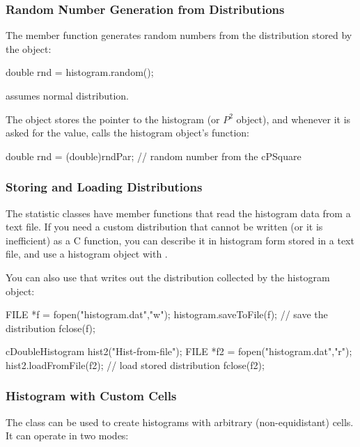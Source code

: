 \subsubsection{Random Number Generation from Distributions}


The  member function generates random
numbers from the distribution stored by the
object:

\begin{cpp}
double rnd = histogram.random();
\end{cpp}


 assumes normal distribution.

The  object stores the pointer to the histogram (or $P^{2}$ object),
and whenever it is asked for the value, calls the histogram object's 
function:

\begin{cpp}
double rnd = (double)rndPar; // random number from the cPSquare
\end{cpp}

\subsubsection{Storing and Loading Distributions}


The statistic classes have  member functions
that read the histogram data from a text file. If you need a custom
distribution that cannot be written (or it
is inefficient) as a C function, you can describe it in histogram form
stored in a text file, and use a histogram object with
.

You can also use that writes out the distribution
collected by the histogram object:

\begin{cpp}
FILE *f = fopen("histogram.dat","w");
histogram.saveToFile(f); // save the distribution
fclose(f);

cDoubleHistogram hist2("Hist-from-file");
FILE *f2 = fopen("histogram.dat","r");
hist2.loadFromFile(f2); // load stored distribution
fclose(f2);
\end{cpp}


\subsubsection{Histogram with Custom Cells}


The  class can be used to create
histograms with arbitrary (non-equidistant) cells.
It can operate in two modes:

